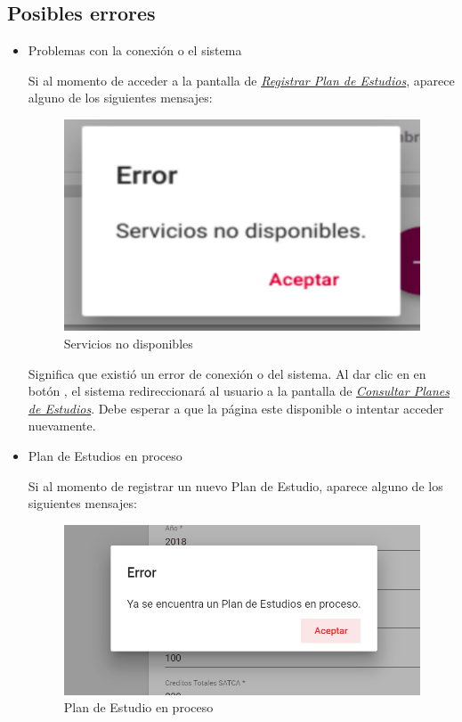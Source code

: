 \subsection{Posibles errores}
\begin{itemize}
	
	\item Problemas con la conexión o el sistema
	
	Si al momento de acceder a la pantalla de \hyperlink{registrarPE}{\textit{Registrar Plan de Estudios}}, aparece alguno de los siguientes mensajes:
		\begin{figure}[!hbtp]
		\centering
		\hypertarget{error}{\includegraphics[width=0.7\linewidth]{images/SP4-GPE/error}}
		\caption{Servicios no disponibles}
		\label{error}
		\end{figure}
	
	
	Significa que existió un error de conexión o del sistema. Al dar clic en en botón , el sistema redireccionará al usuario a la pantalla de \hyperlink{consultarPE}{\textit{Consultar Planes de Estudios}}. Debe esperar a que la página este disponible o intentar acceder nuevamente.
	\newpage
	\item Plan de Estudios en proceso
	
	Si al momento de registrar un nuevo Plan de Estudio, aparece alguno de los siguientes mensajes:
	\begin{figure}[!hbtp]
		\centering
		\hypertarget{error1}{\includegraphics[width=0.7\linewidth]{images/SP4-GPE/error1}}
		\caption{Plan de Estudio en proceso}
		\label{error1}
	\end{figure}
	

\end{itemize}
